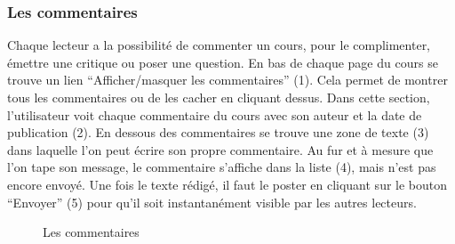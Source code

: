 \documentclass[a4paper,10pt,twoside]{sphinxmanual}
\begin{document}
\subsubsection{Les commentaires}
\label{functionalities:les-commentaires}
Chaque lecteur a la possibilité de commenter un cours, pour le complimenter, émettre une critique ou poser une question. En bas de chaque page du cours se trouve un lien ``Afficher/masquer les commentaires'' (1). Cela permet de montrer tous les commentaires ou de les cacher en cliquant dessus. Dans cette section, l'utilisateur voit chaque commentaire du cours avec son auteur et la date de publication (2). En dessous des commentaires se trouve une zone de texte (3) dans laquelle l'on peut écrire son propre commentaire. Au fur et à mesure que l'on tape son message, le commentaire s'affiche dans la liste (4), mais n'est pas encore envoyé. Une fois le texte rédigé, il faut le poster en cliquant sur le bouton ``Envoyer'' (5) pour qu'il soit instantanément visible par les autres lecteurs.
\begin{figure}[htbp]
\centering
\capstart

\caption{Les commentaires}\end{figure}
\end{document}
